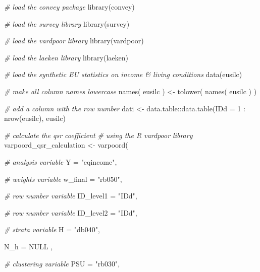 \documentclass[
]{book}
\newenvironment{Shaded}{\begin{snugshade}}{\end{snugshade}}
\newcommand{\AttributeTok}[1]{\textcolor[rgb]{0.77,0.63,0.00}{#1}}
\newcommand{\CommentTok}[1]{\textcolor[rgb]{0.56,0.35,0.01}{\textit{#1}}}
\newcommand{\ConstantTok}[1]{\textcolor[rgb]{0.00,0.00,0.00}{#1}}
\newcommand{\DecValTok}[1]{\textcolor[rgb]{0.00,0.00,0.81}{#1}}
\newcommand{\FunctionTok}[1]{\textcolor[rgb]{0.00,0.00,0.00}{#1}}
\newcommand{\NormalTok}[1]{#1}
\newcommand{\OtherTok}[1]{\textcolor[rgb]{0.56,0.35,0.01}{#1}}
\newcommand{\SpecialCharTok}[1]{\textcolor[rgb]{0.00,0.00,0.00}{#1}}
\newcommand{\StringTok}[1]{\textcolor[rgb]{0.31,0.60,0.02}{#1}}
\begin{document}
\begin{Shaded}
\begin{Highlighting}[]
\CommentTok{\# load the convey package}
\FunctionTok{library}\NormalTok{(convey)}

\CommentTok{\# load the survey library}
\FunctionTok{library}\NormalTok{(survey)}

\CommentTok{\# load the vardpoor library}
\FunctionTok{library}\NormalTok{(vardpoor)}

\CommentTok{\# load the laeken library}
\FunctionTok{library}\NormalTok{(laeken)}

\CommentTok{\# load the synthetic EU statistics on income \& living conditions}
\FunctionTok{data}\NormalTok{(eusilc)}

\CommentTok{\# make all column names lowercase}
\FunctionTok{names}\NormalTok{( eusilc ) }\OtherTok{\textless{}{-}} \FunctionTok{tolower}\NormalTok{( }\FunctionTok{names}\NormalTok{( eusilc ) )}

\CommentTok{\# add a column with the row number}
\NormalTok{dati }\OtherTok{\textless{}{-}}\NormalTok{ data.table}\SpecialCharTok{::}\FunctionTok{data.table}\NormalTok{(}\AttributeTok{IDd =} \DecValTok{1} \SpecialCharTok{:} \FunctionTok{nrow}\NormalTok{(eusilc), eusilc)}

\CommentTok{\# calculate the qsr coefficient}
\CommentTok{\# using the R vardpoor library}
\NormalTok{varpoord\_qsr\_calculation }\OtherTok{\textless{}{-}}
    \FunctionTok{varpoord}\NormalTok{(}
    
        \CommentTok{\# analysis variable}
        \AttributeTok{Y =} \StringTok{"eqincome"}\NormalTok{, }
        
        \CommentTok{\# weights variable}
        \AttributeTok{w\_final =} \StringTok{"rb050"}\NormalTok{,}
        
        \CommentTok{\# row number variable}
        \AttributeTok{ID\_level1 =} \StringTok{"IDd"}\NormalTok{,}
        
        \CommentTok{\# row number variable}
        \AttributeTok{ID\_level2 =} \StringTok{"IDd"}\NormalTok{,}
        
        \CommentTok{\# strata variable}
        \AttributeTok{H =} \StringTok{"db040"}\NormalTok{, }
        
        \AttributeTok{N\_h =} \ConstantTok{NULL}\NormalTok{ ,}
        
        \CommentTok{\# clustering variable}
        \AttributeTok{PSU =} \StringTok{"rb030"}\NormalTok{, }
        

\end{Highlighting}
\end{Shaded}
\end{document}
